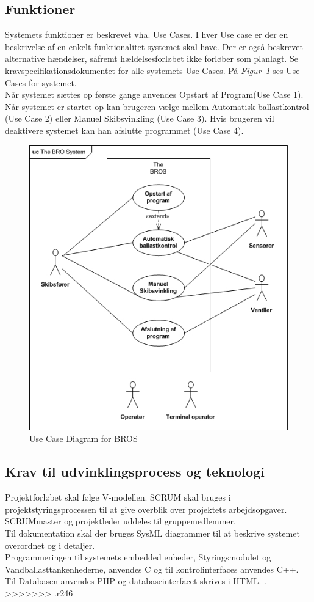 \subsection{Funktioner}
Systemets funktioner er beskrevet vha. Use Cases. I hver Use case er der en beskrivelse af en enkelt funktionalitet systemet skal have. Der er også beskrevet alternative hændelser, såfremt hældelsesforløbet ikke forløber som planlagt. Se kravspecifikationsdokumentet for alle systemets Use Cases. På \textit{Figur~\ref{fig:UCDBROS}} ses Use Cases for systemet.\\
Når systemet sættes op første gange anvendes Opstart af Program(Use Case 1). Når systemet er startet op kan brugeren vælge mellem Automatisk ballastkontrol (Use Case 2) eller Manuel Skibsvinkling (Use Case 3). Hvis brugeren vil deaktivere systemet kan han afslutte programmet (Use Case 4).
\begin{figure}[hbtp]
\centering
\includegraphics[width=1\textwidth]{billeder/UCDBROS}
\caption{Use Case Diagram for BROS}
\label{fig:UCDBROS}
\end{figure}
\subsection{Krav til udvinklingsprocess og teknologi}
Projektforløbet skal følge V-modellen. SCRUM skal bruges i projektstyringsprocessen til at give overblik over projektets arbejdsopgaver. SCRUMmaster og projektleder uddeles til gruppemedlemmer.\\
Til dokumentation skal der bruges SysML diagrammer til at beskrive systemet overordnet og i detaljer.\\
Programmeringen til systemets embedded enheder, Styringsmodulet og Vandballasttankenhederne, anvendes C og til kontrolinterfaces anvendes C++. Til Databasen anvendes PHP  og databaseinterfacet skrives i HTML. .
>>>>>>> .r246

